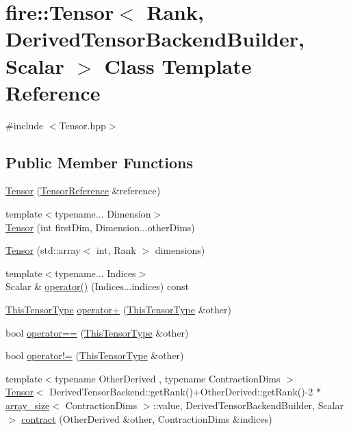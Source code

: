 \hypertarget{a00046}{}\section{fire\+:\+:Tensor$<$ Rank, Derived\+Tensor\+Backend\+Builder, Scalar $>$ Class Template Reference}
\label{a00046}


{\ttfamily \#include $<$Tensor.\+hpp$>$}

\subsection*{Public Member Functions}
\begin{DoxyCompactItemize}
\item 
\hyperlink{a00046_a3cfcf4029a3ce3088d8e20c42c0b7284}{Tensor} (\hyperlink{a00103_a744d7805ef98562de55f32012ab11cfb}{Tensor\+Reference} \&reference)
\item 
{\footnotesize template$<$typename... Dimension$>$ }\\\hyperlink{a00046_abbfb7560aca654a8a7ec5ab18b6af16a}{Tensor} (int first\+Dim, Dimension...\+other\+Dims)
\item 
\hyperlink{a00046_a4b2b898dd5d6c9dec53d0fa1bf0c6591}{Tensor} (std\+::array$<$ int, Rank $>$ dimensions)
\item 
{\footnotesize template$<$typename... Indices$>$ }\\Scalar \& \hyperlink{a00046_a0411f345018b784a81f65bd1ef393cca}{operator()} (Indices...\+indices) const 
\item 
\hyperlink{a00046_ac86105ceb5e209854b2554a755024bd4}{This\+Tensor\+Type} \hyperlink{a00046_a20377472ae56dcaa2c0f67feb13900e7}{operator+} (\hyperlink{a00046_ac86105ceb5e209854b2554a755024bd4}{This\+Tensor\+Type} \&other)
\item 
bool \hyperlink{a00046_a5f24a2528292de76b6c52e2cc99acf9c}{operator==} (\hyperlink{a00046_ac86105ceb5e209854b2554a755024bd4}{This\+Tensor\+Type} \&other)
\item 
bool \hyperlink{a00046_a53ac3eadb4a5047c56e749b7e7c4d53d}{operator!=} (\hyperlink{a00046_ac86105ceb5e209854b2554a755024bd4}{This\+Tensor\+Type} \&other)
\item 
{\footnotesize template$<$typename Other\+Derived , typename Contraction\+Dims $>$ }\\\hyperlink{a00046}{Tensor}$<$ Derived\+Tensor\+Backend\+::get\+Rank()+Other\+Derived\+::get\+Rank()-\/2 $\ast$\hyperlink{a00007}{array\+\_\+size}$<$ Contraction\+Dims $>$\+::value, Derived\+Tensor\+Backend\+Builder, Scalar $>$ \hyperlink{a00046_abf5a45aa771a93365950eb5093a8304c}{contract} (Other\+Derived \&other, Contraction\+Dims \&indices)

\end{DoxyCompactItemize}
